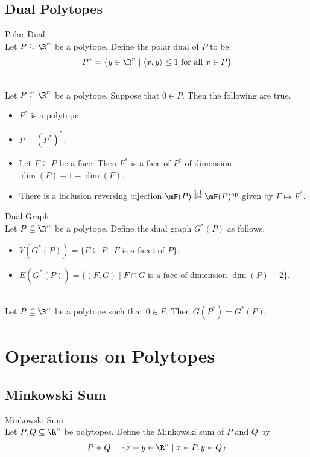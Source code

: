 \documentclass[a4paper]{article}
\begin{document}
\subsection{Dual Polytopes}
\begin{defn}{Polar Dual}{}\\
Let $P\subseteq\R^n$ be a polytope. Define the polar dual of $P$ to be $$P^\ast=\{y\in\R^n\;|\;\langle x,y\rangle\leq 1\text{ for all }x\in P\}$$
\end{defn}

\begin{prp}{}{}\\
Let $P\subseteq\R^n$ be a polytope. Suppose that $0\in P$. Then the following are true. 
\begin{itemize}
\item $P^\ast$ is a polytope. 
\item $P=(P^\ast)^\ast$. 
\item Let $F\subseteq P$ be a face. Then $F^\ast$ is a face of $P^\ast$ of dimension $\dim(P)-1-\dim(F)$. 
\item There is a inclusion reversing bijection $\mF(P)\overset{1:1}{\leftrightarrow}\mF(P)^\text{op}$ given by $F\mapsto F^\ast$. 
\end{itemize}
\end{prp}

\begin{defn}{Dual Graph}{}\\
Let $P\subseteq\R^n$ be a polytope. Define the dual graph $G^\ast(P)$ as follows. 
\begin{itemize}
\item $V(G^\ast(P))=\{F\subseteq P\;|\;F\text{ is a facet of }P\}$. 
\item $E(G^\ast(P))=\{(F,G)\;|\;F\cap G\text{ is a face of dimension }\dim(P)-2\}$. 
\end{itemize}
\end{defn}

\begin{lmm}{}{}\\
Let $P\subseteq\R^n$ be a polytope such that $0\in P$. Then $G(P^\ast)=G^\ast(P)$. 
\end{lmm}

\pagebreak
\section{Operations on Polytopes}
\subsection{Minkowski Sum}
\begin{defn}{Minkowski Sum}{}\\
Let $P,Q\subseteq\R^n$ be polytopes. Define the Minkowski sum of $P$ and $Q$ by $$P+Q=\{x+y\in\R^n\;|\;x\in P,y\in Q\}$$
\end{defn}
\end{document}
